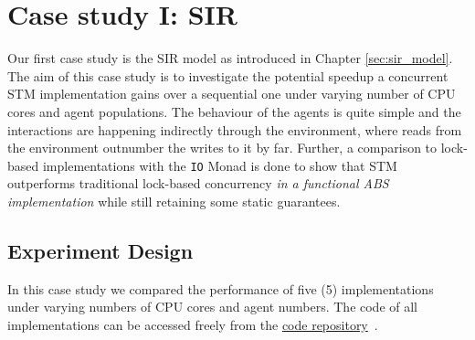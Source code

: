 \section{Case study I: SIR}
\label{sec:concurrent_sir}
Our first case study is the SIR model as introduced in Chapter \ref{sec:sir_model}. The aim of this case study is to investigate the potential speedup a concurrent STM implementation gains over a sequential one under varying number of CPU cores and agent populations. The behaviour of the agents is quite simple and the interactions are happening indirectly through the environment, where reads from the environment outnumber the writes to it by far. Further, a comparison to lock-based implementations with the \texttt{IO} Monad is done to show that STM outperforms traditional lock-based concurrency \textit{in a functional ABS implementation} while still retaining some static guarantees.

\subsection{Experiment Design}
In this case study we compared the performance of five (5) implementations under varying numbers of CPU cores and agent numbers. The code of all implementations can be accessed freely from the \href{https://github.com/thalerjonathan/haskell-stm-sir}{code repository}~\cite{thaler_stm_sir_repository}.

